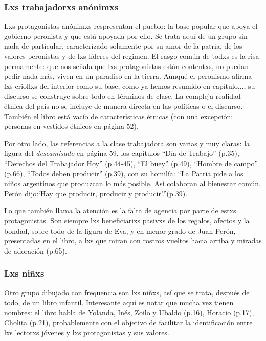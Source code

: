 \documentclass[
10pt, %
a4paper, %
oneside, %
headinclude,footinclude, %
]{scrartcl}
\begin{document}
\subsubsection{Lxs trabajadorxs anónimxs}
Lxs protagonistas anónimxs respresentan el pueblo: la base popular que apoya el gobierno peronista y que está apoyada por ello.
Se trata aquí de un grupo sin nada de particular, caracterizado solamente por su amor de la patria, de los valores peronistas y de lxs líderes del regimen.
El rasgo común de todxs es la risa permamente: que nos señala que lxs protagonistas están contentxs, no puedan pedir nada más, viven en un paradiso en la tierra.
Aunqué el peronismo afirma lxs criollxs del interior como su base, como ya hemos resumido en capítulo..., su discurso se construye sobre todo en términos de clase.
La compleja realidad étnica del país no se incluye de manera directa en las políticas o el discurso.
También el libro está vacío de características étnicas (con una excepción: personas en vestidos étnicos en página 52).

Por otro lado, las referencias a la clase trabajadora son varias y muy claras:
la figura del \textit{descamisado} en página 59, los capítulos ``Día de Trabajo'' (p.35), ``Derechos del Trabajador Hoy'' (p.44-45), ``El buey'' (p.49), ``Hombre de campo'' (p.66), ``Todos deben producir'' (p.39),
con su homilía:
``La Patria pide a los niños argentinos que produzcan lo más posible. Así colaboran al bienestar común. Perón dijo:`Hay que producir, producir y producir'.''(p.39).

Lo que también llama la atención es la falta de agencia por parte de estxs protagonistas.
Son siempre lxs beneficiarixs pasivxs de los regalos, afectos y la bondad, sobre todo de la figura de Eva, y en menor grado de Juan Perón, presentadas en el libro, a lxs que miran con rostros vueltos hacia arriba y miradas de adoración (p.65).

\subsubsection{Lxs niñxs}
Otro grupo dibujado con freqüencia son lxs niñxs, así que se trata, después de todo, de un libro infantil.
Interesante aquí es notar que mucha vez tienen nombres: el libro habla de Yolanda, Inés, Zoilo y Ubaldo (p.16), Horacio (p.17), Cholita (p.21),
probablemente con el objetivo de facilitar la identificación entre lxs lectorxs jóvenes y lxs protagonistas y sus valores.

\end{document}
